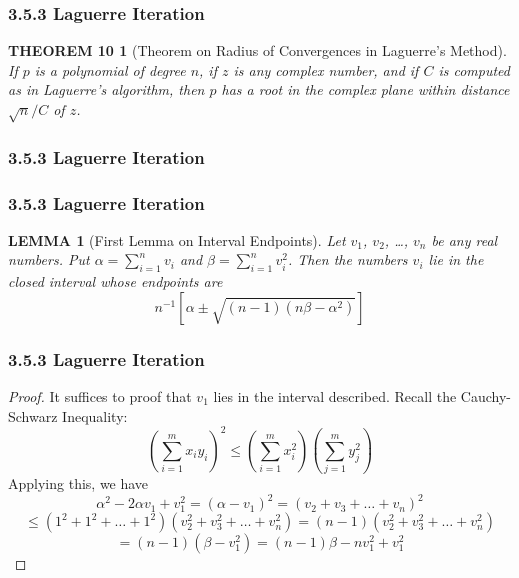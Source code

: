 \documentclass[notheorems,mathserif,table,compress]{beamer}  %
\begin{document}
\begin{frame}
  \frametitle{3.5.3 Laguerre Iteration}
  \newtheorem*{theorem 10}{THEOREM 10}
  \begin{theorem 10}[Theorem on Radius of Convergences in Laguerre's Method]
  If $p$ is a polynomial of degree $n$, if $z$ is any complex number, and if $C$ is computed as in Laguerre's algorithm, then $p$ has a root in the complex plane within distance $\sqrt n/C$ of $z$.
  \end{theorem 10}
\end{frame}


\begin{frame}
  \frametitle{3.5.3 Laguerre Iteration}
  
\end{frame}


\begin{frame}
  \frametitle{3.5.3 Laguerre Iteration}
  \newtheorem{lemma 1}{LEMMA}
  \begin{lemma 1}[First Lemma on Interval Endpoints]
  Let $v_1$, $v_2$, \ldots , $v_n$ be any real numbers. Put $\alpha=\sum_{i=1}^n v_i$ and $ \beta=\sum_{i=1}^n v_i^2$. Then the numbers $v_i$ lie in the closed interval whose endpoints are
  \begin{displaymath}
  n^{-1}[\alpha \pm \sqrt{(n-1)(n\beta-\alpha^2)}]
  \end{displaymath}
  \end{lemma 1} 
\end{frame}


\begin{frame}
  \frametitle{3.5.3 Laguerre Iteration}
  \begin{proof}
  It suffices to proof that $v_1$ lies in the interval described. Recall the Cauchy-Schwarz Inequality:
  \[ \left( \sum_{i=1}^m x_iy_i \right)^2 \le \left(\sum_{i=1}^m x_i^2\right)\left(\sum_{j=1}^m y_j^2\right) \]
  Applying this, we have
  \begin{displaymath}
  \alpha^2-2\alpha v_1+v_1^2=(\alpha-v_1)^2=(v_2+v_3+\ldots+v_n)^2
  \end{displaymath}
  \begin{displaymath}
  \le(1^2+1^2+\ldots+1^2)(v_2^2+v_3^2+\ldots+v_n^2)=(n-1)(v_2^2+v_3^2+\ldots+v_n^2)
  \end{displaymath}
  \begin{displaymath}
  =(n-1)(\beta-v_1^2)=(n-1)\beta-nv_1^2+v_1^2
  \end{displaymath}
  \end{proof}
\end{frame}
\end{document}
